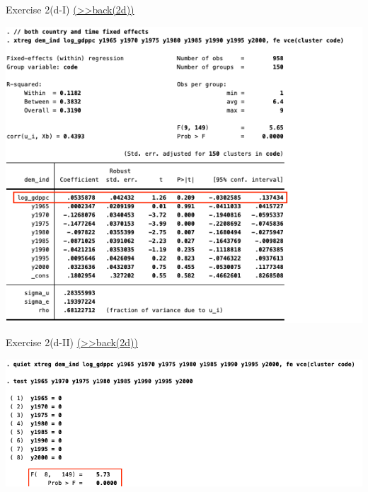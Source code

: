 \documentclass[
  10pt,
  ignorenonframetext,
]{beamer}
\begin{document}
\begin{frame}{Exercise 2(d-I)
\footnotesize \protect\hyperlink{Ex2-BothFEs-A}{(\textgreater\textgreater back(2d))}
\normalsize }
\protect\hypertarget{Ex2-BothFEs}{}
\begin{flushleft}\includegraphics[width=0.9\linewidth]{pictures/Ex2-BothFEs} \end{flushleft}
\end{frame}

\begin{frame}{Exercise 2(d-II)
\footnotesize \protect\hyperlink{Ex2-BothFEs-A}{(\textgreater\textgreater back(2d))}
\normalsize}
\protect\hypertarget{exercise-2d-ii-back2d}{}
\begin{flushleft}\includegraphics[width=0.9\linewidth]{pictures/Ex2-BothFEsTest} \end{flushleft}
\end{frame}
\end{document}
